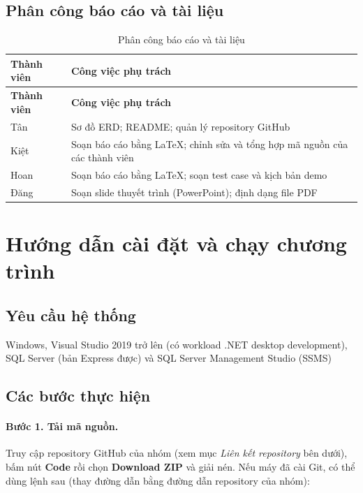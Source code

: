 \subsection{Phân công báo cáo và tài liệu}

\begin{longtable}{@{}>{\raggedright\arraybackslash}p{2.3cm} >{\raggedright\arraybackslash}p{12.2cm}@{}}
  \caption{Phân công báo cáo và tài liệu}\label{tab:pc-tailieu}\\
  \toprule
  \textbf{Thành viên} & \textbf{Công việc phụ trách} \\
  \midrule
  \endfirsthead
  \toprule
  \textbf{Thành viên} & \textbf{Công việc phụ trách} \\
  \midrule
  \endhead
  \bottomrule
  \endlastfoot
  Tân & Sơ đồ ERD; README; quản lý repository GitHub \\[2pt]
  Kiệt & Soạn báo cáo bằng LaTeX; chỉnh sửa và tổng hợp mã nguồn của các thành viên \\[2pt]
  Hoan & Soạn báo cáo bằng LaTeX; soạn test case và kịch bản demo \\[2pt]
  Đăng & Soạn slide thuyết trình (PowerPoint); định dạng file PDF \\
\end{longtable}

\section{Hướng dẫn cài đặt và chạy chương trình}

\subsection{Yêu cầu hệ thống}
Windows, Visual Studio 2019 trở lên (có workload .NET desktop development), SQL Server (bản Express được) và SQL Server Management Studio (SSMS)

\subsection{Các bước thực hiện}
 
\paragraph{Bước 1. Tải mã nguồn.} Truy cập repository GitHub của nhóm (xem mục \textit{Liên kết repository} bên dưới), bấm nút \textbf{Code} rồi chọn \textbf{Download ZIP} và giải nén. Nếu máy đã cài Git, có thể dùng lệnh sau (thay đường dẫn bằng đường dẫn repository của nhóm):

